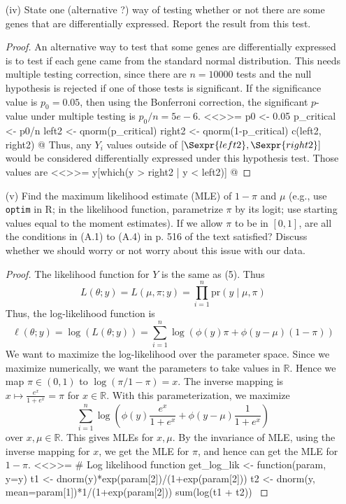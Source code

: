 \documentclass[letterpaper, 12pt]{article}
\newcommand{\pr}{\text{pr}}
\newcommand{\R}{\mathbb{R}}
\begin{document}
\begin{enumerate}
\begin{enumerate}
\item[(iv)]
State one (alternative ?) way of testing whether or not there are some genes that are differentially expressed. Report the result from this test.
\begin{proof}
An alternative way to test that some genes are differentially expressed is to test if each gene came from the standard normal distribution. This needs multiple testing correction, since there are $n = 10000$ tests and the null hypothesis is rejected if one of those tests is significant. If the significance value is $p_0 = 0.05$, then using the Bonferroni correction, the significant $p$-value under multiple testing is $p_0 / n = 5e-6$.
<<>>=
p0 <- 0.05
p_critical <- p0/n
left2 <- qnorm(p_critical)
right2 <- qnorm(1-p_critical)
c(left2, right2)
@
Thus, any $Y_i$ values outside of $[\Sexpr{left2}, \Sexpr{right2}]$ would be considered differentially expressed under this hypothesis test. Those values are
<<>>=
y[which(y > right2 | y < left2)]
@
\end{proof}

\item[(v)]
Find the maximum likelihood estimate (MLE) of $1 - \pi$ and $\mu$ (e.g., use \texttt{optim} in R; in the likelihood function, parametrize $\pi$ by its logit; use starting values equal to the moment estimates). If we allow $\pi$ to be in $[0,1]$, are all the conditions in (A.1) to (A.4) in p. 516 of the text satisfied? Discuss whether we should worry or not worry about this issue with our data.
\begin{proof}
The likelihood function for $Y$ is the same as (5). Thus
\begin{equation*}
L(\theta; y) = L(\mu, \pi; y) = \prod_{i=1}^n \pr(y \mid \mu, \pi)
\end{equation*}
Thus, the log-likelihood function is
\begin{equation*}
\label{lleq}
\ell (\theta; y) = \log (L(\theta;y)) 
= \sum_{i=1}^n  \log(\phi(y)\pi
+
\phi(y-\mu)(1-\pi))
\end{equation*}
We want to maximize the log-likelihood over the parameter space.
Since we maximize numerically, we want the parameters to take values in $\R$. 
Hence we map $\pi \in (0,1)$ to $\log(\pi / 1-\pi) = x$. 
The inverse mapping is $x \mapsto \frac{e^x}{1+e^x} = \pi$ for $x \in \R$.
With this parameterization, we maximize
\begin{equation}
\sum_{i=1}^n
\log \left(
\phi(y)
\frac{e^x}{1+e^x}
+ 
\phi(y -\mu) 
\frac{1}{1+e^x}
\right) 
\end{equation}
over $x,\mu \in \R$. This gives MLEs for $x, \mu$. 
By the invariance of MLE, using the inverse mapping for $x$, we get the MLE for $\pi$, and hence can get the MLE for $1-\pi$.
<<>>=
# Log likelihood function
get_log_lik <- function(param, y=y)
{
    t1 <- dnorm(y)*exp(param[2])/(1+exp(param[2]))
    t2 <- dnorm(y, mean=param[1])*1/(1+exp(param[2]))
    sum(log(t1 + t2))
}


\end{proof}
\end{enumerate}
\end{enumerate}
\end{document}
